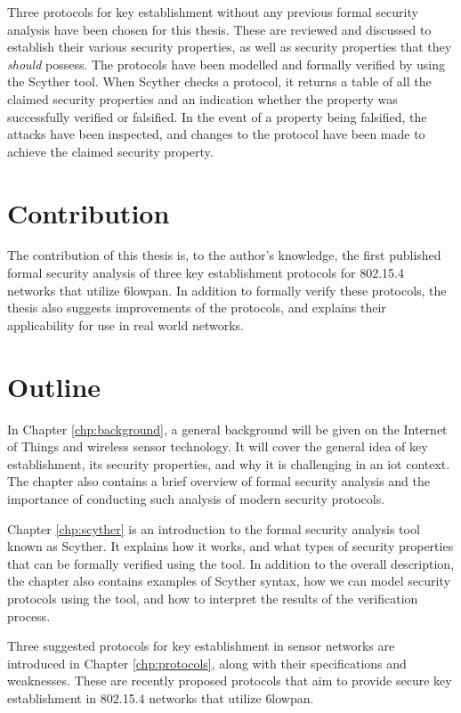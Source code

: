 Three protocols for key establishment without any previous formal security analysis have been chosen for this thesis. These are reviewed and discussed to establish their various security properties, as well as security properties that they \textit{should} possess. The protocols have been modelled and formally verified by using the Scyther tool. When Scyther checks a protocol, it returns a table of all the claimed security properties and an indication whether the property was successfully verified or falsified. In the event of a property being falsified, the attacks have been inspected, and changes to the protocol have been made to achieve the claimed security property. 

\section{Contribution}

The contribution of this thesis is, to the author's knowledge, the first published formal security analysis of three key establishment protocols for 802.15.4 networks that utilize \gls{6lowpan}. In addition to formally verify these protocols, the thesis also suggests improvements of the protocols, and explains their applicability for use in real world networks.


\section{Outline}

In Chapter \ref{chp:background}, a general background will be given on the Internet of Things and wireless sensor technology. It will cover the general idea of key establishment, its security properties, and why it is challenging in an \gls{iot} context. The chapter also contains a brief overview of formal security analysis and the importance of conducting such analysis of modern security protocols.

Chapter \ref{chp:scyther} is an introduction to the formal security analysis tool known as Scyther. It explains how it works, and what types of security properties that can be formally verified using the tool. In addition to the overall description, the chapter also contains examples of Scyther syntax, how we can model security protocols using the tool, and how to interpret the results of the verification process.

Three suggested protocols for key establishment in sensor networks are introduced in Chapter \ref{chp:protocols}, along with their specifications and weaknesses. These are recently proposed protocols that aim to provide secure key establishment in 802.15.4 networks that utilize \gls{6lowpan}.

